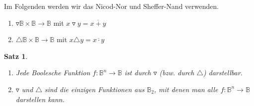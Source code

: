 \documentclass[ngerman]{scrartcl}
\theoremstyle{custom}
\newtheorem{ms}[mdef]{Satz}
\newcommand{\0}{\mathbf{0}}
\newcommand{\1}{\mathbf{L}}
\begin{document}
Im Folgenden werden wir das Nicod-Nor und Sheffer-Nand verwenden.
\begin{enumerate}
\item $\triangledown \mathds{B} \times \mathds{B} \rightarrow
  \mathds{B}$ mit $x \triangledown y = \overline{x + y}$
\item $\triangle \mathds{B} \times \mathds{B} \rightarrow
  \mathds{B}$ mit $x \triangle y = \overline{x \cdot y}$
\end{enumerate}

\begin{ms}
\begin{enumerate}
\item Jede Boolesche Funktion $f: \mathds{B}^n \rightarrow \mathds{B}$
  ist durch $\triangledown$ (bzw. durch $\triangle$) darstellbar.
\item $\triangledown$ und $\triangle$ sind die einzigen Funktionen aus
  $\mathds{B}_2$, mit denen man alle $f: \mathds{B}^n \rightarrow
  \mathds{B}$ darstellen kann.
\end{enumerate}
\end{ms}
\end{document}
